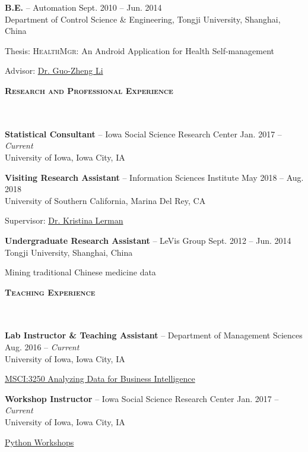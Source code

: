 \documentclass{article}
\newcommand{\header}[1]{{
\hspace*{-15pt}\vspace*{6pt} \textbf{\textsc{\large{#1}}}} \vspace*{-6pt} 
\lineunder
}
\newcommand{\lineunder}{
\vspace*{-8pt} \\ \hspace*{-15pt} 
\hrulefill \\
}
\newcommand{\employer}[4]{{
\vspace*{2pt}%
\textbf{#1} #2 \hfill #3\\ #4 \vspace*{2pt}}
}
\renewcommand{\labelitemii}{
$\vcenter{\hbox{\tiny$\bullet$}}$\hspace*{-3pt}
}
\newenvironment{bullet-list-minor}{
\begin{list}{\labelitemii}{\setlength\leftmargin{15pt} 
\topsep 0pt \itemsep -2pt}}{\vspace*{4pt}\end{list}
}
\begin{document}
    \employer{B.E.}{-- Automation}{Sept. 2010 -- Jun. 2014}{Department of Control Science \& Engineering, Tongji University, Shanghai, China}
	\begin{bullet-list-minor}
    	\item Thesis: \textsc{HealthMgr}: An Android Application for Health Self-management
        \item Advisor: \href{http://www.ndctcm.cn/gzli/}{Dr. Guo-Zheng Li}
    \end{bullet-list-minor}
    
\vspace*{4pt}
\header{Research and Professional Experience}
    \employer{Statistical Consultant}{-- Iowa Social Science Research Center}{Jan. 2017 -- \textit{Current}}{University of Iowa, Iowa City, IA}
    \vspace*{4pt}

    \employer{Visiting Research Assistant}{-- Information Sciences Institute}{May 2018 -- Aug. 2018}{University of Southern California, Marina Del Rey, CA}
	\begin{bullet-list-minor}
        \item Supervisor: \href{www.isi.edu/~lerman/}{Dr. Kristina Lerman}
    \end{bullet-list-minor}
    
    \employer{Undergraduate Research Assistant}{-- LeVis Group}{Sept. 2012 -- Jun. 2014}{Tongji University, Shanghai, China}
	\begin{bullet-list-minor}
        \item Mining traditional Chinese medicine data
    \end{bullet-list-minor}
    
\vspace*{4pt}
\header{Teaching Experience}
    \employer{Lab Instructor \& Teaching Assistant}{-- Department of Management Sciences}{Aug. 2016 -- \textit{Current}}{University of Iowa, Iowa City, IA}
	\begin{bullet-list-minor}
        \item {\href{https://myui.uiowa.edu/my-ui/courses/dashboard.page?q.courseSubject=MSCI&q.courseNumber=3250&showResults=1}{MSCI:3250 Analyzing Data for Business Intelligence}}
    \end{bullet-list-minor}
    
    \employer{Workshop Instructor}{-- Iowa Social Science Research Center}{Jan. 2017 -- \textit{Current}}{University of Iowa, Iowa City, IA}
	\begin{bullet-list-minor}
        \item \href{https://github.com/zhiyzuo/python-tutorial}{Python Workshops}
    \end{bullet-list-minor}
    
\end{document}
